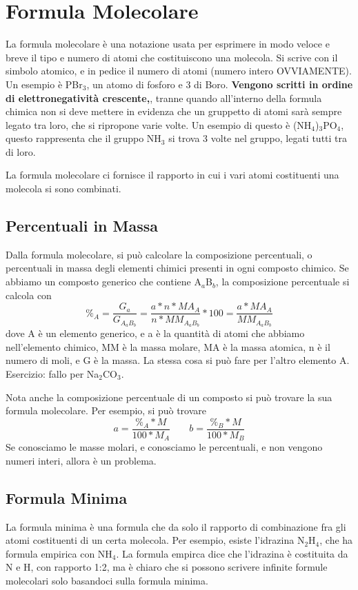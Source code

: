\documentclass[a4paper]{article}
\begin{document}
\section{Formula Molecolare}
La formula molecolare è una notazione usata per esprimere in modo veloce e breve il tipo e numero di atomi che costituiscono una molecola. Si scrive con il simbolo atomico, e in pedice il numero di atomi (numero intero OVVIAMENTE). Un esempio è PBr$_3$, un atomo di fosforo e 3 di Boro. \textbf{Vengono scritti in ordine di elettronegatività crescente,}, tranne quando all'interno della formula chimica non si deve mettere in evidenza che un gruppetto di atomi sarà sempre legato tra loro, che si ripropone varie volte. Un esempio di questo è (NH$_4$)$_3$PO$_4$, questo rappresenta che il gruppo NH$_3$ si trova 3 volte nel gruppo, legati tutti tra di loro.  

La formula molecolare ci fornisce il rapporto in cui i vari atomi costituenti una molecola si sono combinati.

\subsection{Percentuali in Massa}
Dalla formula molecolare, si può calcolare la composizione percentuali, o percentuali in massa degli elementi chimici presenti in ogni composto chimico. Se abbiamo un composto generico che contiene A$_a$B$_b$, la composizione percentuale si calcola con 
\begin{equation*}
    \%_A = \frac{G_a}{G_{A{_a}B{_b}}} = \frac{a*n*MA_A}{n * MM_{A{_a}B{_b}}} * 100 = \frac{a*MA_A}{MM_{A_{a}B_{b}}}
\end{equation*}
dove A è un elemento generico, e a è la quantità di atomi che abbiamo nell'elemento chimico, MM è la massa molare, MA è la massa atomica, n è il numero di moli, e G è la massa. La stessa cosa si può fare per l'altro elemento A. Esercizio: fallo per Na$_2$CO$_3$. 

Nota anche la composizione percentuale di un composto si può trovare la sua formula molecolare. Per esempio, si può trovare 
\begin{equation*}\label{eq1}
    a=\frac{\%_A*M}{100*M_A} \; \; \; \; \; \; \; b=\frac{\%_B*M}{100*M_B}
\end{equation*}
Se conosciamo le masse molari, e conosciamo le percentuali, e non vengono numeri interi, allora è un problema. 

\subsection{Formula Minima}
La formula minima è una formula che da solo il rapporto di combinazione fra gli atomi costituenti di un certa molecola. Per esempio, esiste l'idrazina N$_2$H$_4$, che ha formula empirica con NH$_4$. La formula empirca dice che l'idrazina è costituita da N e H, con rapporto 1:2, ma è chiaro che si possono scrivere infinite formule molecolari solo basandoci sulla formula minima. 
\end{document}
